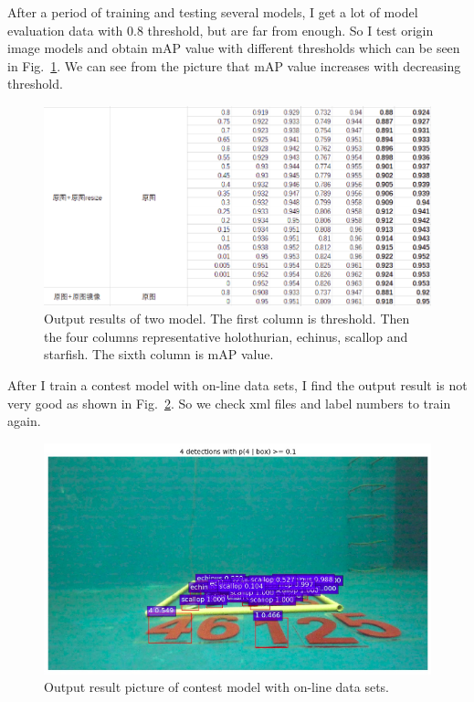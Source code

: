 \documentclass[a4paper]{article}
\begin{document}
	After a period of training and testing several models, I get a lot of model evaluation data with 0.8 threshold, but are far from enough. So I test origin image models and obtain mAP value with different thresholds which can be seen in Fig.~\ref{p3}. We can see from the picture that mAP value increases with decreasing threshold. 
	
	\begin{figure}
		\begin{center}
			\includegraphics[scale=0.5]{figures/3.png}
		\end{center}
		\caption{Output results of two model. The first column is threshold. Then the four columns representative holothurian, echinus, scallop and starfish. The sixth column is mAP value.}
		\label{p3}
	\end{figure}
	
	After I train a contest model with on-line data sets, I find the output result is not very good as shown in Fig.~\ref{p5}. So we check xml files and label numbers to train again.
	\begin{figure}
		\begin{center}
			\includegraphics[scale=0.5]{figures/10.png}
		\end{center}
		\caption{Output result picture of contest model with on-line data sets.}
		\label{p5}
	\end{figure}
	
\end{document}
